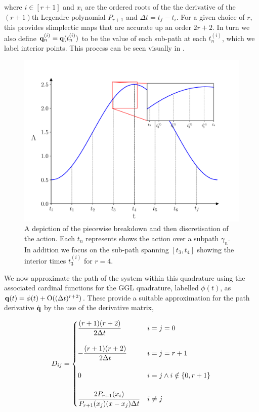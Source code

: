 
where $i \in [r + 1]$ and $x_i$ are the ordered roots of the the derivative of the $(r + 1)$th Legendre polynomial $P_{r + 1}$ and $\Delta t = t_f - t_i$. For a given choice of $r$, this provides slimplectic maps that are accurate up an order $2r + 2$\cite{tsangSLIMPLECTICINTEGRATORSVARIATIONAL2015}. In turn we also define $\vb{q}_n^{(i)} = \vb{q}(t^{(i)}_n)$ to be the value of each sub-path at each $t^{(i)}_n$, which we label interior points. This process can be seen visually in .

\begin{figure}[t]
  \includegraphics[width=\columnwidth]{figures/si-process.pdf}
  \caption{A depiction of the piecewise breakdown and then discretisation of the action. Each $t_n$ represents shows the action over a subpath $\gamma_n$. In addition we focus on the sub-path spanning $[t_3, t_4]$ showing the interior times $t_{3}^{(i)}$ for $r = 4$.}
  \label{fig:si-process}
\end{figure}

We now approximate the path of the system within this quadrature using the associated cardinal functions for the GGL quadrature, labelled $\phi(t)$, as \(\vb q(t) = \phi(t) + \mathord{\mathrm{O}}((\Delta t)^{r + 2})\). These provide a suitable approximation for the path derivative $\dot{\vb q}$ by the use of the derivative matrix,

\begin{equation}
\label{eq:dij}
  D_{ij} = \begin{cases}
  	\dfrac{(r + 1)(r + 2)}{2\Delta t} &i = j = 0 \\\\
  	-\dfrac{(r + 1)(r + 2)}{2\Delta t} & i = j = r + 1 \\\\
  	0 & i = j \land i \notin \left\{0, r + 1\right\} \\\\
  	\dfrac{2P_{r + 1}(x_i)}{P_{r+1}(x_j)(x - x_j)\Delta t} & i\neq j
  \end{cases}
\end{equation}

